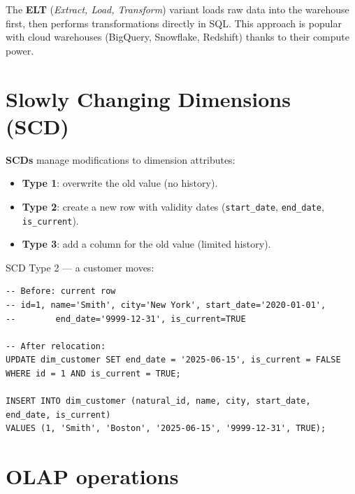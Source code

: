 \begin{definition}[ELT]
The \textbf{ELT} (\emph{Extract, Load, Transform}) variant loads raw data
into the warehouse first, then performs transformations directly in SQL.
This approach is popular with cloud warehouses (BigQuery, Snowflake,
Redshift) thanks to their compute power.
\end{definition}

\section{Slowly Changing Dimensions (SCD)}

\begin{definition}
\textbf{SCDs} manage modifications to dimension attributes:
\begin{itemize}
  \item \textbf{Type 1}: overwrite the old value (no history).
  \item \textbf{Type 2}: create a new row with validity dates
        (\texttt{start\_date}, \texttt{end\_date}, \texttt{is\_current}).
  \item \textbf{Type 3}: add a column for the old value (limited history).
\end{itemize}
\end{definition}

\begin{example}
SCD Type 2 --- a customer moves:
\begin{verbatim}
-- Before: current row
-- id=1, name='Smith', city='New York', start_date='2020-01-01',
--        end_date='9999-12-31', is_current=TRUE

-- After relocation:
UPDATE dim_customer SET end_date = '2025-06-15', is_current = FALSE
WHERE id = 1 AND is_current = TRUE;

INSERT INTO dim_customer (natural_id, name, city, start_date, end_date, is_current)
VALUES (1, 'Smith', 'Boston', '2025-06-15', '9999-12-31', TRUE);
\end{verbatim}
\end{example}

\section{OLAP operations}


